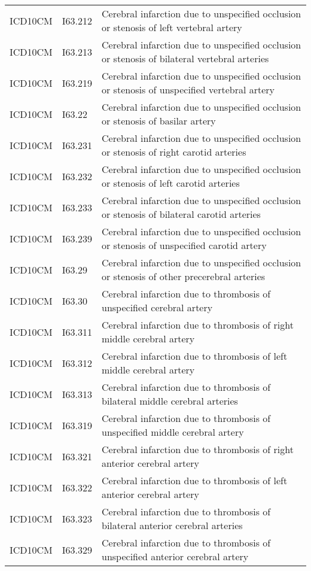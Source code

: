 \begin{longtable}{p{}p{}p{}}
  ICD10CM & I63.212 & Cerebral infarction due to unspecified occlusion or stenosis of left vertebral artery \\ 
  ICD10CM & I63.213 & Cerebral infarction due to unspecified occlusion or stenosis of bilateral vertebral arteries \\ 
  ICD10CM & I63.219 & Cerebral infarction due to unspecified occlusion or stenosis of unspecified vertebral artery \\ 
  ICD10CM & I63.22 & Cerebral infarction due to unspecified occlusion or stenosis of basilar artery \\ 
  ICD10CM & I63.231 & Cerebral infarction due to unspecified occlusion or stenosis of right carotid arteries \\ 
  ICD10CM & I63.232 & Cerebral infarction due to unspecified occlusion or stenosis of left carotid arteries \\ 
  ICD10CM & I63.233 & Cerebral infarction due to unspecified occlusion or stenosis of bilateral carotid arteries \\ 
  ICD10CM & I63.239 & Cerebral infarction due to unspecified occlusion or stenosis of unspecified carotid artery \\ 
  ICD10CM & I63.29 & Cerebral infarction due to unspecified occlusion or stenosis of other precerebral arteries \\ 
  ICD10CM & I63.30 & Cerebral infarction due to thrombosis of unspecified cerebral artery \\ 
  ICD10CM & I63.311 & Cerebral infarction due to thrombosis of right middle cerebral artery \\ 
  ICD10CM & I63.312 & Cerebral infarction due to thrombosis of left middle cerebral artery \\ 
  ICD10CM & I63.313 & Cerebral infarction due to thrombosis of bilateral middle cerebral arteries \\ 
  ICD10CM & I63.319 & Cerebral infarction due to thrombosis of unspecified middle cerebral artery \\ 
  ICD10CM & I63.321 & Cerebral infarction due to thrombosis of right anterior cerebral artery \\ 
  ICD10CM & I63.322 & Cerebral infarction due to thrombosis of left anterior cerebral artery \\ 
  ICD10CM & I63.323 & Cerebral infarction due to thrombosis of bilateral anterior cerebral arteries \\ 
  ICD10CM & I63.329 & Cerebral infarction due to thrombosis of unspecified anterior cerebral artery \\ 

\end{longtable}
